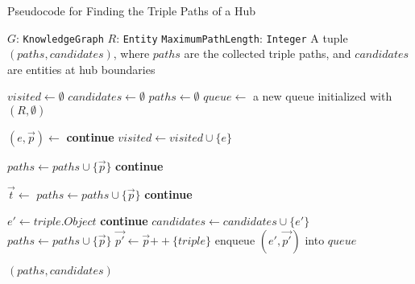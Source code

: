 \begin{algorithm}[p]
\caption{Pseudocode for Finding the Triple Paths of a Hub}
\label{alg:finding_paths_in_hub}
\begin{algorithmic}[1]
\PersistentState
    \Statex $G$: \texttt{KnowledgeGraph} 
\Require 
    \Statex $R$: \texttt{Entity} 
    \Statex \texttt{MaximumPathLength}: \texttt{Integer} 
\Ensure
    \Statex A tuple \((paths, candidates)\), where $paths$ are the collected triple paths, and $candidates$ are entities at hub boundaries

\Statex
{}
    \State $visited \gets \emptyset$ 
    \State $candidates \gets \emptyset$ 
    \State $paths \gets \emptyset$ 
    \State $queue \gets$ a new queue initialized with \((R, \emptyset)\)
    
        \State $(e, \vec{p}) \gets$  
            \State \textbf{continue} 
        \EndIf
        \State $visited \gets visited \cup \{e\}$

            \State $paths \gets paths \cup \{\vec{p}\}$
            \State \textbf{continue}
        \EndIf
        
        \State $\vec{t} \gets$  
             \State $paths \gets paths \cup \{\vec{p}\}$ 
            \State\textbf{continue}
        \EndIf
        
            \State $e' \gets triple.Object$
                \State \textbf{continue} 
            \EndIf
                \State $candidates \gets candidates \cup \{e'\}$
                \State $paths \gets paths \cup \{\vec{p}\}$
            \Else
                \State $\vec{p'} \gets \vec{p} \mathbin{++} \{triple\}$ 
                \State enqueue \((e', \vec{p'})\) into $queue$ 
            \EndIf
        \EndFor
    \EndWhile
    
    \State \Return $(paths, candidates)$
\EndFunction
\end{algorithmic}
\end{algorithm}

